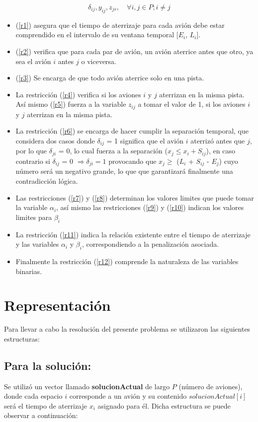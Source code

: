\documentclass[letter, 10pt]{article}
\begin{document}
\begin{equation}
\delta_{i j}, y_{i j}, z_{j r}, \quad \forall i, j \in P ; i \neq j
\label{r12}
\end{equation}

\begin{itemize}
    \item (\ref{r1}) asegura que el tiempo de aterrizaje para cada avión debe estar comprendido en el intervalo de su ventana temporal [$E_i$, $L_i$].
    \item (\ref{r2}) verifica que para cada par de avión, un avión aterrice antes que otro, ya sea el avión $i$ antes $j$ o viceversa.
    \item (\ref{r3}) Se encarga de que todo avión aterrice solo en una pista. 
    \item La restricción (\ref{r4}) verifica si los aviones $i$ y $j$ aterrizan en la misma pista. Así mismo (\ref{r5}) fuerza a la variable $z_{ij}$ a tomar el valor de 1, si los aviones $i$ y $j$ aterrizan en la misma pista.
    \item La restricción (\ref{r6}) se encarga de hacer cumplir la separación temporal, que considera dos casos donde $\delta_{ij}$ = 1 significa que el avión $i$ aterrizó antes que $j$, por lo que $\delta_{ji}$ = 0, lo cual fuerza a la separación ($x_j \leq  x_i + S_{ij}$), en caso contrario si $\delta_{ij}$ = 0 $\Rightarrow \delta_{ji} = 1$ provocando que  $x_j \geq$ ($L_i$ + $S_{ij}$ - $E_j$) cuyo número será un negativo grande, lo que que garantizará finalmente una contradicción lógica.
    \item Las restricciones (\ref{r7}) y (\ref{r8}) determinan los valores limites que puede tomar la variable $\alpha_i$, así mismo las restricciones (\ref{r9}) y (\ref{r10}) indican los valores limites para $\beta_i$
    \item La restricción (\ref{r11}) indica la relación existente entre el tiempo de aterrizaje y las variables $\alpha_i$ y $\beta_i$, correspondiendo a la penalización asociada.
    \item Finalmente la restricción (\ref{r12}) comprende la naturaleza de las variables binarias.
\end{itemize}

\section{Representación}
Para llevar a cabo la resolución del presente problema se utilizaron las siguientes estructuras:
\subsection{Para la solución:}
Se utilizó un vector llamado \textbf{solucionActual} de largo \textbf{$P$} (número de aviones), donde cada espacio $i$ corresponde a un avión y su contenido $solucionActual[i]$ será el tiempo de aterrizaje $x_i$ asignado para él. Dicha estructura se puede observar a continuación:
\end{document}
